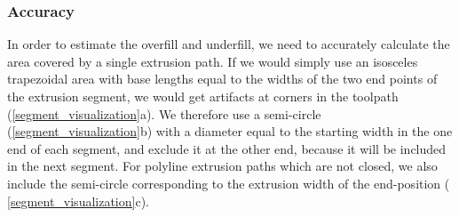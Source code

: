 



\subsubsection{Accuracy}
In order to estimate the overfill and underfill, we need to accurately calculate the area covered by a single extrusion path.
If we would simply use an isosceles trapezoidal area with base lengths equal to the widths of the two end points of the extrusion segment, we would get artifacts at corners in the toolpath (\cref{segment_visualization}a).
We therefore use a semi-circle (\cref{segment_visualization}b) with a diameter equal to the starting width in the one end of each segment, and exclude it at the other end, because it will be included in the next segment.
For polyline extrusion paths which are not closed, we also include the semi-circle corresponding to the extrusion width of the end-position ( \cref{segment_visualization}c).


